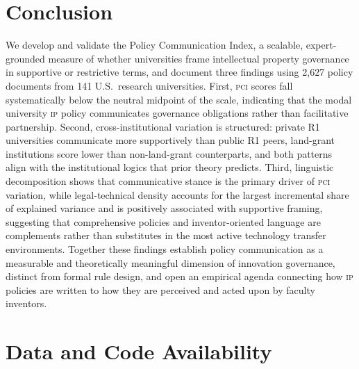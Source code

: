 \documentclass[12pt]{article}
\newcommand{\PCI}{\textsc{pci}}
\newcommand{\IP}{\textsc{ip}}
\begin{document}
\section{Conclusion}

We develop and validate the Policy Communication Index, a scalable, 
expert-grounded measure of whether universities frame intellectual 
property governance in supportive or restrictive terms, and document 
three findings using 2,627 policy documents from 141 U.S.\ research 
universities.  First, \PCI{} scores fall systematically below the 
neutral midpoint of the scale, indicating that the modal university 
\IP{} policy communicates governance obligations rather than 
facilitative partnership.  Second, cross-institutional variation is 
structured: private R1 universities communicate more supportively 
than public R1 peers, land-grant institutions score lower than 
non-land-grant counterparts, and both patterns align with the 
institutional logics that prior theory predicts.  Third, linguistic 
decomposition shows that communicative stance is the primary driver 
of \PCI{} variation, while legal-technical density accounts for the 
largest incremental share of explained variance and is positively 
associated with supportive framing, suggesting that comprehensive 
policies and inventor-oriented language are complements rather than 
substitutes in the most active technology transfer environments.  
Together these findings establish policy communication as a 
measurable and theoretically meaningful dimension of innovation 
governance, distinct from formal rule design, and open an empirical 
agenda connecting how \IP{} policies are written to how they are 
perceived and acted upon by faculty inventors.

\section*{Data and Code Availability}
\end{document}
